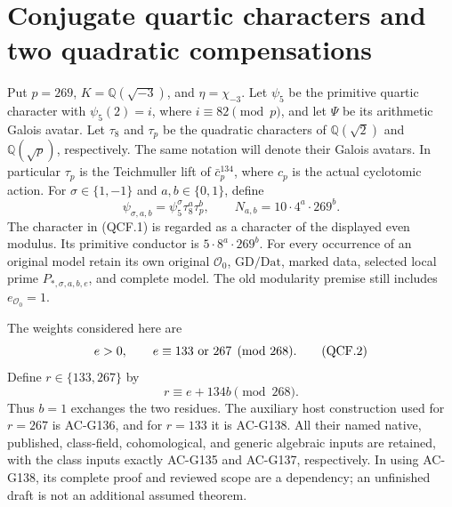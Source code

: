\section{Conjugate quartic characters and two quadratic compensations}
\label{sec:cubic-quartic-compensated-families}

Put \(p=269\), \(K=\mathbb Q(\sqrt{-3})\), and
\(\eta=\chi_{-3}\).  Let \(\psi_5\) be the primitive quartic
character with \(\psi_5(2)=i\), where \(i\equiv82\pmod p\),
and let \(\Psi\) be its arithmetic Galois avatar.
Let \(\tau_8\) and \(\tau_p\) be the quadratic characters of
\(\mathbb Q(\sqrt2)\) and \(\mathbb Q(\sqrt p)\), respectively.
The same notation will denote their Galois avatars.  In particular
\(\tau_p\) is the Teichmuller lift of \(\bar c_p^{134}\),
where \(c_p\) is the actual cyclotomic action.
For \(\sigma\in\{1,-1\}\) and \(a,b\in\{0,1\}\), define
\[
 \psi_{\sigma,a,b}=\psi_5^\sigma\tau_8^a\tau_p^b,
 \qquad N_{a,b}=10\cdot4^a\cdot269^b.
 \tag{QCF.1}
\]
The character in (QCF.1) is regarded as a character of the displayed
even modulus.  Its primitive conductor is \(5\cdot8^a\cdot269^b\).
For every occurrence of an original model retain its own original
\(\mathcal O_0\), \(\mathrm{GD}/\mathrm{Dat}\), marked data,
selected local prime \(P_{*,\sigma,a,b,e}\), and complete model.
The old modularity premise still includes \(e_{\mathcal O_0}=1\).

The weights considered here are
\[
 e>0,\qquad e\equiv133\ \hbox{or}\ 267\pmod{268}.
 \tag{QCF.2}
\]
Define \(r\in\{133,267\}\) by
\[
                         r\equiv e+134b\pmod{268}.
 \tag{QCF.3}
\]
Thus \(b=1\) exchanges the two residues.  The auxiliary host
construction used for \(r=267\) is AC-G136, and for \(r=133\)
it is AC-G138.  All their named native, published, class-field,
cohomological, and generic algebraic inputs are retained, with the
class inputs exactly AC-G135 and AC-G137, respectively.  In using
AC-G138, its complete proof and reviewed scope are a dependency;
an unfinished draft is not an additional assumed theorem.

